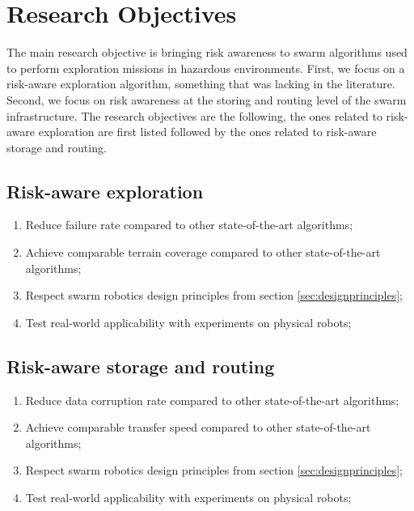 \section{Research Objectives} 
\label{sec:objectifs}
The main research objective is bringing risk awareness to swarm algorithms used to perform exploration missions in hazardous environments. First, we focus on a risk-aware exploration algorithm, something that was lacking in the literature. Second, we focus on risk awareness at the storing and routing level of the swarm infrastructure. The research objectives are the following, the ones related to risk-aware exploration are first listed followed by the ones related to risk-aware storage and routing.


\subsection{Risk-aware exploration}
\begin{enumerate}
    \item Reduce failure rate compared to other state-of-the-art algorithms;
    \item Achieve comparable terrain coverage compared to other state-of-the-art algorithms;
    \item Respect swarm robotics design principles from section \ref{sec:designprinciples};
    \item Test real-world applicability with experiments on physical robots;
\end{enumerate}

\subsection{Risk-aware storage and routing}
\begin{enumerate}
    \item Reduce data corruption rate compared to other state-of-the-art algorithms;
    \item Achieve comparable transfer speed compared to other state-of-the-art algorithms;
    \item Respect swarm robotics design principles from section \ref{sec:designprinciples};
    \item Test real-world applicability with experiments on physical robots;
\end{enumerate}


